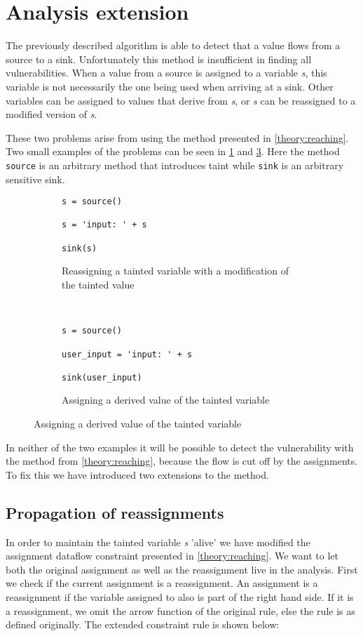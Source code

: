 \section{Analysis extension}
The previously described algorithm is able to detect that a value flows from a source to a sink.
Unfortunately this method is insufficient in finding all vulnerabilities.
When a value from a source is assigned to a variable \textit{s}, this variable is not necessarily the one being used when arriving at a sink.
Other variables can be assigned to values that derive from \textit{s}, or \textit{s} can be reassigned to a modified version of \textit{s}.

These two problems arise from using the method presented in \cref{theory:reaching}.
Two small examples of the problems can be seen in \cref{ext:reassign} and \cref{ext:assign}.
Here the method \texttt{source} is an arbitrary method that introduces taint while \texttt{sink} is an arbitrary sensitive sink.

\begin{figure}[h]

  \begin{subfigure}[b]{0.45\textwidth}
    \begin{lstlisting}[style=python]
s = source()

s = 'input: ' + s

sink(s)
    \end{lstlisting}
    \caption{Reassigning a tainted variable with a modification of the tainted value}
    \label{ext:reassign}
  \end{subfigure}
  ~~
  \begin{subfigure}[b]{0.45\textwidth}
    \begin{lstlisting}[style=python, numbers=none]
s = source()

user_input = 'input: ' + s

sink(user_input)
    \end{lstlisting}
    \caption{Assigning a derived value of the tainted variable}
    \label{ext:assign}
  \end{subfigure}
\end{figure}

In neither of the two examples it will be possible to detect the vulnerability with the method from \cref{theory:reaching}, because the flow is cut off by the assignments.
To fix this we have introduced two extensions to the method.

\subsection{Propagation of reassignments}
In order to maintain the tainted variable \textit{s} 'alive' we have modified the assignment dataflow constraint presented in \cref{theory:reaching}.
We want to let both the original assignment as well as the reassignment live in the analysis.
First we check if the current assignment is a reassignment.
An assignment is a reassignment if the variable assigned to also is part of the right hand side.
If it is a reassignment, we omit the arrow function of the original rule, else the rule is as defined originally.
The extended constraint rule is shown below:

